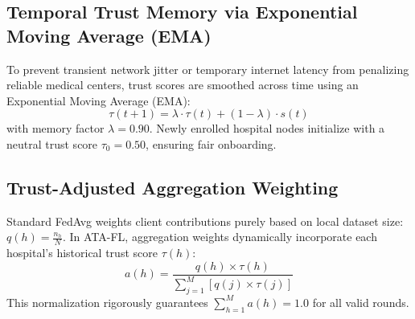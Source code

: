 \documentclass[conference]{IEEEtran}
\begin{document}
\subsection{Temporal Trust Memory via Exponential Moving Average (EMA)}
To prevent transient network jitter or temporary internet latency from penalizing reliable medical centers, trust scores are smoothed across time using an Exponential Moving Average (EMA):
\begin{equation}
\tau(t+1) = \lambda \cdot \tau(t) + (1 - \lambda) \cdot s(t)
\end{equation}
with memory factor $\lambda = 0.90$. Newly enrolled hospital nodes initialize with a neutral trust score $\tau_0 = 0.50$, ensuring fair onboarding.

\subsection{Trust-Adjusted Aggregation Weighting}
Standard FedAvg weights client contributions purely based on local dataset size: $q(h) = \frac{n_h}{N}$. In ATA-FL, aggregation weights dynamically incorporate each hospital's historical trust score $\tau(h)$:
\begin{equation}
a(h) = \frac{q(h) \times \tau(h)}{\sum_{j=1}^M \left[ q(j) \times \tau(j) \right]}
\end{equation}
This normalization rigorously guarantees $\sum_{h=1}^M a(h) = 1.0$ for all valid rounds.
\end{document}

